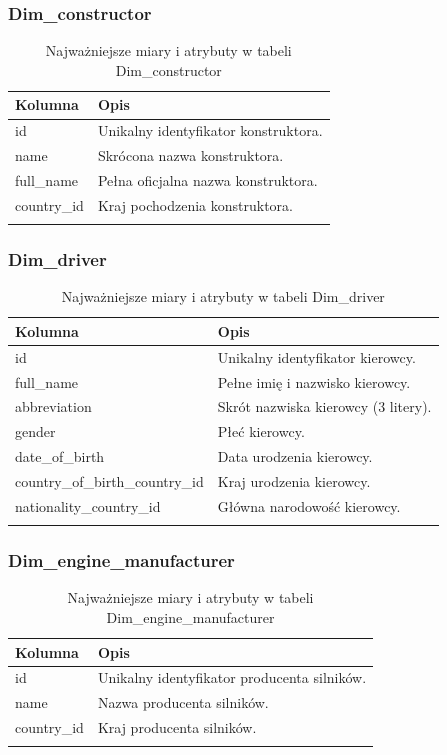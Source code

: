 \documentclass[12pt]{article}
\begin{document}
\subsubsection{Dim\_constructor}
\begin{longtable}{lp{8.5cm}}
\toprule
\textbf{Kolumna} & \textbf{Opis} \\
\midrule
\endhead

id & Unikalny identyfikator konstruktora. \\
name & Skrócona nazwa konstruktora. \\
full\_name & Pełna oficjalna nazwa konstruktora. \\
country\_id & Kraj pochodzenia konstruktora. \\

\bottomrule
\caption{Najważniejsze miary i atrybuty w tabeli Dim\_constructor}
\end{longtable}

\subsubsection{Dim\_driver}
\begin{longtable}{lp{8.5cm}}
\toprule
\textbf{Kolumna} & \textbf{Opis} \\
\midrule
\endhead

id & Unikalny identyfikator kierowcy. \\
full\_name & Pełne imię i nazwisko kierowcy. \\
abbreviation & Skrót nazwiska kierowcy (3 litery). \\
gender & Płeć kierowcy. \\
date\_of\_birth & Data urodzenia kierowcy. \\
country\_of\_birth\_country\_id & Kraj urodzenia kierowcy. \\
nationality\_country\_id & Główna narodowość kierowcy. \\


\bottomrule
\caption{Najważniejsze miary i atrybuty w tabeli Dim\_driver}
\end{longtable}

\subsubsection{Dim\_engine\_manufacturer}
\begin{longtable}{lp{8.5cm}}
\toprule
\textbf{Kolumna} & \textbf{Opis} \\
\midrule
\endhead

id & Unikalny identyfikator producenta silników. \\
name & Nazwa producenta silników. \\
country\_id & Kraj producenta silników. \\


\bottomrule
\caption{Najważniejsze miary i atrybuty w tabeli Dim\_engine\_manufacturer}
\end{longtable}
\end{document}
